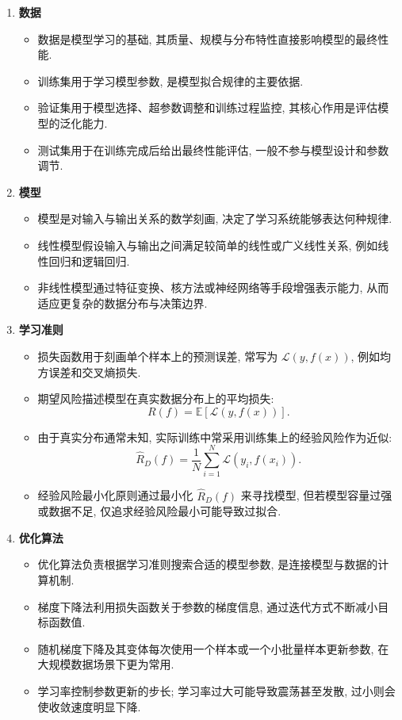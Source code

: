 \documentclass{../nndlcourse}
\begin{document}
\begin{enumerate}
  \item \textbf{数据}
    \begin{itemize}
      \item 数据是模型学习的基础, 其质量、规模与分布特性直接影响模型的最终性能.
      \item 训练集用于学习模型参数, 是模型拟合规律的主要依据.
      \item 验证集用于模型选择、超参数调整和训练过程监控, 其核心作用是评估模型的泛化能力.
      \item 测试集用于在训练完成后给出最终性能评估, 一般不参与模型设计和参数调节.
    \end{itemize}
  \item \textbf{模型}
    \begin{itemize}
      \item 模型是对输入与输出关系的数学刻画, 决定了学习系统能够表达何种规律.
      \item 线性模型假设输入与输出之间满足较简单的线性或广义线性关系, 例如线性回归和逻辑回归.
      \item 非线性模型通过特征变换、核方法或神经网络等手段增强表示能力, 从而适应更复杂的数据分布与决策边界.
    \end{itemize}
  \item \textbf{学习准则}
    \begin{itemize}
      \item 损失函数用于刻画单个样本上的预测误差, 常写为 $\mathcal{L}(y, f(x))$, 例如均方误差和交叉熵损失.
      \item 期望风险描述模型在真实数据分布上的平均损失:
      \[
        R(f) = \mathbb{E}[\mathcal{L}(y, f(x))].
      \]
      \item 由于真实分布通常未知, 实际训练中常采用训练集上的经验风险作为近似:
      \[
        \hat{R}_D(f) = \frac{1}{N} \sum_{i=1}^{N} \mathcal{L}(y_i, f(x_i)).
      \]
      \item 经验风险最小化原则通过最小化 $\hat{R}_D(f)$ 来寻找模型, 但若模型容量过强或数据不足, 仅追求经验风险最小可能导致过拟合.
    \end{itemize}
  \item \textbf{优化算法}
    \begin{itemize}
      \item 优化算法负责根据学习准则搜索合适的模型参数, 是连接模型与数据的计算机制.
      \item 梯度下降法利用损失函数关于参数的梯度信息, 通过迭代方式不断减小目标函数值.
      \item 随机梯度下降及其变体每次使用一个样本或一个小批量样本更新参数, 在大规模数据场景下更为常用.
      \item 学习率控制参数更新的步长; 学习率过大可能导致震荡甚至发散, 过小则会使收敛速度明显下降.
    \end{itemize}
\end{enumerate}
\end{document}
